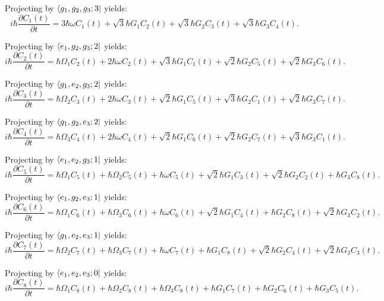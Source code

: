 \documentclass{article}
\theoremstyle{definition}
\begin{document}
Projecting by $\bra{g_{1}, g_{2}, g_{3}; 3}$ yields:\\
\[ i \hbar \frac{\partial C_{1}(t)}{\partial t} = 3 \hbar \omega C_{1}(t) + \sqrt{3} \hbar G_{1} C_{2}(t) + \sqrt{3} \hbar G_{2} C_{3}(t) + \sqrt{3} \hbar G_{3}C_{4}(t). \]

Projecting by $\bra{e_{1}, g_{2}, g_{3}; 2}$ yields:\\
\[ i \hbar \frac{\partial C_{2}(t)}{\partial t} = \hbar \Omega_{1}C_{2}(t) + 2 \hbar \omega C_{2}(t) + \sqrt{3} \hbar G_{1}C_{1}(t) + \sqrt{2} \hbar G_{2}C_{5}(t) + \sqrt{2} \hbar G_{3}C_{6}(t). \]

Projecting by $\bra{g_{1}, e_{2}, g_{3}; 2}$ yields:\\
\[ i \hbar \frac{\partial C_{3}(t)}{\partial t} = \hbar \Omega_{2}C_{3}(t) + 2 \hbar \omega C_{3}(t) + \sqrt{2} \hbar G_{1}C_{5}(t) + \sqrt{3} \hbar G_{2}C_{1}(t) + \sqrt{2} \hbar G_{3}C_{7}(t). \]

Projecting by $\bra{g_{1}, g_{2}, e_{3}; 2}$ yields:\\
\[ i \hbar \frac{\partial C_{4}(t)}{\partial t} = \hbar \Omega_{3}C_{4}(t) + 2 \hbar \omega C_{4}(t) + \sqrt{2} \hbar G_{1}C_{6}(t) + \sqrt{2} \hbar G_{2}C_{7}(t) + \sqrt{3} \hbar G_{3}C_{1}(t). \]

Projecting by $\bra{e_{1}, e_{2}, g_{3}; 1}$ yields:\\
\[ i \hbar \frac{\partial C_{5}(t)}{\partial t} = \hbar \Omega_{1}C_{5}(t) + \hbar \Omega_{2}C_{5}(t) + \hbar \omega C_{5}(t) + \sqrt{2} \hbar G_{1}C_{3}(t) + \sqrt{2} \hbar G_{2}C_{2}(t) + \hbar G_{3}C_{8}(t). \]

Projecting by $\bra{e_{1}, g_{2}, e_{3}; 1}$ yields:\\
\[ i \hbar \frac{\partial C_{6}(t)}{\partial t} = \hbar \Omega_{1}C_{6}(t) + \hbar \Omega_{3}C_{6}(t) + \hbar \omega C_{6}(t) + \sqrt{2} \hbar G_{1}C_{4}(t) + \hbar G_{2}C_{8}(t) + \sqrt{2} \hbar G_{3}C_{2}(t). \]

Projecting by $\bra{g_{1}, e_{2}, e_{3}; 1}$ yields:\\
\[ i \hbar \frac{\partial C_{7}(t)}{\partial t} = \hbar \Omega_{2}C_{7}(t) + \hbar \Omega_{3}C_{7}(t) + \hbar \omega C_{7}(t) + \hbar G_{1}C_{8}(t) + \sqrt{2} \hbar G_{2}C_{4}(t) + \sqrt{2} \hbar G_{3}C_{3}(t). \]

Projecting by $\bra{e_{1}, e_{2}, e_{3}; 0}$ yields:\\
\[ i \hbar \frac{\partial C_{8}(t)}{\partial t} = \hbar \Omega_{1}C_{8}(t) + \hbar \Omega_{2}C_{8}(t) + \hbar \Omega_{3}C_{8}(t) + \hbar G_{1}C_{7}(t) + \hbar G_{2}C_{6}(t) + \hbar G_{3}C_{5}(t). \]
\end{document}

